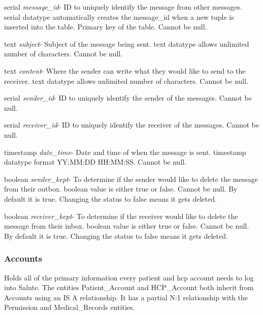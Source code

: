 \begin{description}
\item serial \textit{message\_id}- ID to uniquely identify the message from other messages. serial datatype automatically creates the message\_id when a new tuple is inserted into the table.  Primary key of the table.  Cannot be null.
\item text \textit{subject}- Subject of the message being sent. text datatype allows unlimited number of characters.  Cannot be null.
\item text \textit{content}- Where the sender can write what they would like to send to the receiver.  text datatype allows unlimited number of characters.  Cannot be null.
\item serial \textit{sender\_id}- ID to uniquely identify the sender of the messages.  Cannot be null.
\item serial \textit{receiver\_id}- ID to uniquely identify the receiver of the messages.  Cannot be null.
\item timestamp \textit{date\_time}- Date and time of when the message is sent.  timestamp datatype format YY:MM:DD HH:MM:SS.  Cannot be null.
\item boolean \textit{sender\_kept}- To determine if the sender would like to delete the message from their outbox.  boolean value is either true or false.  Cannot be null.  By default it is true.  Changing the status to false means it gets deleted.
\item boolean \textit{receiver\_kept}- To determine if the receiver would like to delete the message from their inbox.  boolean value is either true or false.  Cannot be null.  By default it is true.  Changing the status to false means it gets deleted.
\end{description}

\subsubsection{Accounts}
Holds all of the primary information every patient and hcp account needs to log into Salute.  The entities Patient\_Account and HCP\_Account both inherit from Accounts using an IS A relationship.  It has a partial N:1 relationship with the Permission and Medical\_Records entities.

